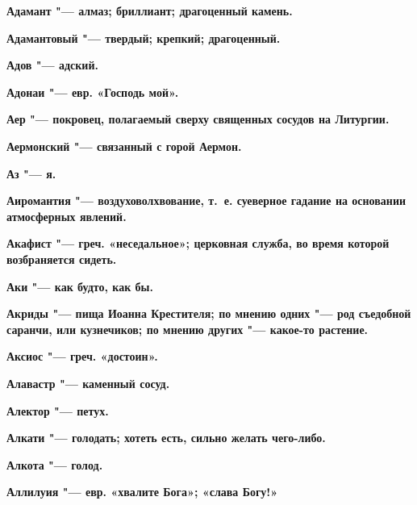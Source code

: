 \begin{multicols}{2}
\bfseries Адамант\normalfont{} "--- алмаз; бриллиант; драгоценный камень. 




\bfseries Адамантовый\normalfont{} "--- твердый; крепкий; драгоценный. 




\bfseries Адов\normalfont{} "--- адский. 




\bfseries Адонаи\normalfont{} "--- евр. «Господь мой». 




\bfseries Аер\normalfont{} "--- покровец, полагаемый сверху священных сосудов на Литургии. 




\bfseries Аермонский\normalfont{} "--- связанный с горой Аермон. 




\bfseries Аз\normalfont{} "--- я. 




\bfseries Аиромантия\normalfont{} "--- воздуховолхвование, т.~е. суеверное гадание на основании атмосферных явлений. 




\bfseries Акафист\normalfont{} "--- греч. «неседальное»; церковная служба, во время которой возбраняется сидеть. 




\bfseries Аки\normalfont{} "--- как будто, как бы. 




\bfseries Акриды\normalfont{} "--- пища Иоанна Крестителя; по мнению одних "--- род съедобной саранчи, или кузнечиков; по мнению других "--- какое-то растение. 




\bfseries Аксиос\normalfont{} "--- греч. «достоин». 




\bfseries Алавастр\normalfont{} "--- каменный сосуд. 




\bfseries Алектор\normalfont{} "--- петух. 




\bfseries Алкати\normalfont{} "--- голодать; хотеть есть, сильно желать чего-либо. 




\bfseries Алкота\normalfont{} "--- голод. 




\bfseries Аллилуия\normalfont{} "--- евр. «хвалите Бога»; «слава Богу!» 





\end{multicols}
